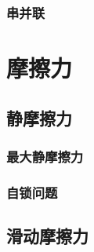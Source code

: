 \documentclass[cn,blue,11pt,normal]{elegantnote}
\begin{document}
\begin{proset}
	
\end{proset}
\begin{proset}
	
\end{proset}

\subsubsection{串并联}
\begin{proset}
	
\end{proset}

\section{摩擦力}
\subsection{静摩擦力}
\begin{proset}
	
\end{proset}
\begin{proset}
	
\end{proset}
\begin{proset}
	
\end{proset}
\subsubsection{最大静摩擦力}
\begin{proset}
	
\end{proset}

\subsubsection{自锁问题}
\begin{proset}
	
\end{proset}
	
\subsection{滑动摩擦力}
\begin{proset}
	
\end{proset}
\end{document}
